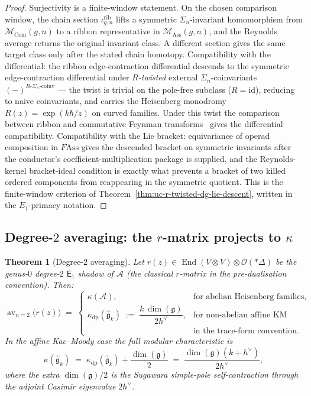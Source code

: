 \documentclass[11pt,reqno]{amsart}
\newtheorem{theorem}{Theorem}[section]
\theoremstyle{definition}
\theoremstyle{remark}
\newcommand{\cA}{\mathcal{A}}
\newcommand{\cM}{\mathcal{M}}
\newcommand{\cO}{\mathcal{O}}
\newcommand{\Eone}{\mathsf{E}_{1}}
\newcommand{\Ass}{\mathrm{Ass}}
\newcommand{\Com}{\mathrm{Com}}
\DeclareMathOperator{\End}{End}
\DeclareMathOperator{\av}{av}
\newcommand{\fg}{\mathfrak{g}}
\newcommand{\id}{\mathrm{id}}
\newcommand{\FMAss}{F\!\Ass}
\numberwithin{equation}{section}
\begin{document}
\begin{proof}
Surjectivity is a finite-window statement. On the chosen comparison
window, the chain section
\(\iota^{\mathrm{rib}}_{g,n}\) lifts a symmetric
\(\Sigma_n\)-invariant homomorphism from \(\cM_\Com(g,n)\) to a
ribbon representative in \(\cM_\Ass(g,n)\), and the Reynolds average
returns the original invariant class. A different section gives the
same target class only after the stated chain homotopy.
Compatibility with the differential: the ribbon edge-contraction
differential descends to the symmetric edge-contraction differential
under \emph{$R$-twisted} external $\Sigma_n$-coinvariants
$(-)^{R\text{-}\Sigma_n\text{-coinv}}$ --- the twist is trivial on the
pole-free subclass ($R=\id$), reducing to naive coinvariants, and
carries the Heisenberg monodromy $R(z) = \exp(k\hbar/z)$ on curved
families. Under this twist the comparison between ribbon and
commutative Feynman transforms~\cite{GK98} gives the differential
compatibility. Compatibility with the Lie bracket: equivariance of
operad composition in $\FMAss$ gives the descended bracket on symmetric
invariants after the conductor's coefficient-multiplication package is
supplied, and the Reynolds-kernel bracket-ideal condition is exactly
what prevents a bracket of two killed ordered components from
reappearing in the symmetric quotient. This is the finite-window
criterion of Theorem~\ref{thm:uc-r-twisted-dg-lie-descent}, written in
the \(E_1\)-primacy notation.
\end{proof}

\subsection{Degree-$2$ averaging: the $r$-matrix projects to
$\kappa$}

\begin{theorem}[Degree-$2$ averaging]
\label{thm:degree-2-av}
Let $r(z) \in \End(V \otimes V) \otimes \cO(*\Delta)$ be the
genus-$0$ degree-$2$ $\Eone$ shadow of $\cA$ (the classical
$r$-matrix in the pre-dualisation convention). Then:
\begin{equation}\label{eq:degree-2-av}
  \av_{n=2}\bigl(r(z)\bigr) \;=\;
  \begin{cases}
    \kappa(\cA), &
      \text{for abelian Heisenberg families,} \\[4pt]
    \kappa_{\mathrm{dp}}(\widehat{\fg}_k)
    \;:=\; \dfrac{k\,\dim(\fg)}{2h^\vee}, &
      \text{for non-abelian affine KM}\\
      & \text{in the trace-form convention.}
  \end{cases}
\end{equation}
In the affine Kac--Moody case the full modular characteristic is
\begin{equation}\label{eq:km-kappa-full}
  \kappa(\widehat{\fg}_k)
  \;=\;
  \kappa_{\mathrm{dp}}(\widehat{\fg}_k) + \frac{\dim(\fg)}{2}
  \;=\;
  \frac{\dim(\fg)(k+h^\vee)}{2h^\vee},
\end{equation}
where the extra $\dim(\fg)/2$ is the Sugawara simple-pole
self-contraction through the adjoint Casimir eigenvalue $2h^\vee$.
\end{theorem}
\end{document}
